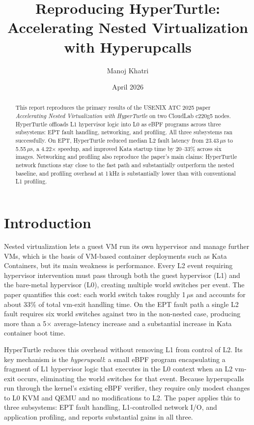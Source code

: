 \documentclass[11pt]{article}
\title{Reproducing HyperTurtle: Accelerating Nested Virtualization with Hyperupcalls}
\author{Manoj Khatri}
\date{April 2026}
\begin{document}
\maketitle


\begin{abstract}
This report reproduces the primary results of the USENIX ATC 2025 paper \textit{Accelerating Nested Virtualization with HyperTurtle} on two CloudLab c220g5 nodes. HyperTurtle offloads L1 hypervisor logic into L0 as eBPF programs across three subsystems: EPT fault handling, networking, and profiling. All three subsystems ran successfully. On EPT, HyperTurtle reduced median L2 fault latency from 23.43\,$\mu$s to 5.55\,$\mu$s, a 4.22$\times$ speedup, and improved Kata startup time by 20--33\% across six images. Networking and profiling also reproduce the paper's main claims: HyperTurtle network functions stay close to the fast path and substantially outperform the nested baseline, and profiling overhead at 1\,kHz is substantially lower than with conventional L1 profiling.
\end{abstract}

\section{Introduction}

Nested virtualization lets a guest VM run its own hypervisor and manage further VMs, which is the basis of VM-based container deployments such as Kata Containers, but its main weakness is performance. Every L2 event requiring hypervisor intervention must pass through both the guest hypervisor (L1) and the bare-metal hypervisor (L0), creating multiple world switches per event. The paper quantifies this cost: each world switch takes roughly 1\,$\mu$s and accounts for about 33\% of total vm-exit handling time. On the EPT fault path a single L2 fault requires six world switches against two in the non-nested case, producing more than a 5$\times$ average-latency increase and a substantial increase in Kata container boot time.

HyperTurtle reduces this overhead without removing L1 from control of L2. Its key mechanism is the \emph{hyperupcall}: a small eBPF program encapsulating a fragment of L1 hypervisor logic that executes in the L0 context when an L2 vm-exit occurs, eliminating the world switches for that event. Because hyperupcalls run through the kernel's existing eBPF verifier, they require only modest changes to L0 KVM and QEMU and no modifications to L2. The paper applies this to three subsystems: EPT fault handling, L1-controlled network I/O, and application profiling, and reports substantial gains in all three.
\end{document}
